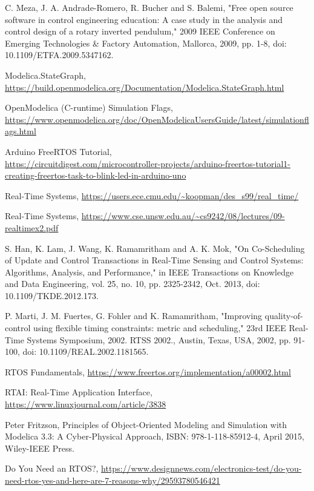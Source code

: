 \documentclass[12pt]{report}
\begin{document}
\begin{thebibliography}{111}
C. Meza, J. A. Andrade-Romero, R. Bucher and S. Balemi, "Free open source software in control engineering education: A case study in the analysis and control design of a rotary inverted pendulum," 2009 IEEE Conference on Emerging Technologies \& Factory Automation, Mallorca, 2009, pp. 1-8, doi: 10.1109/ETFA.2009.5347162.

Modelica.StateGraph, \url{https://build.openmodelica.org/Documentation/Modelica.StateGraph.html}

OpenModelica (C-runtime) Simulation Flags, \url{https://www.openmodelica.org/doc/OpenModelicaUsersGuide/latest/simulationflags.html}

Arduino FreeRTOS Tutorial,\\
\url{https://circuitdigest.com/microcontroller-projects/arduino-freertos-tutorial1-creating-freertos-task-to-blink-led-in-arduino-uno}

Real-Time Systems, \url{https://users.ece.cmu.edu/~koopman/des_s99/real_time/}

Real-Time Systems, \url{https://www.cse.unsw.edu.au/~cs9242/08/lectures/09-realtimex2.pdf}

S. Han, K. Lam, J. Wang, K. Ramamritham and A. K. Mok, "On Co-Scheduling of Update and Control Transactions in Real-Time Sensing and Control Systems: Algorithms, Analysis, and Performance," in IEEE Transactions on Knowledge and Data Engineering, vol. 25, no. 10, pp. 2325-2342, Oct. 2013, doi: 10.1109/TKDE.2012.173.

P. Marti, J. M. Fuertes, G. Fohler and K. Ramamritham, "Improving quality-of-control using flexible timing constraints: metric and scheduling," 23rd IEEE Real-Time Systems Symposium, 2002. RTSS 2002., Austin, Texas, USA, 2002, pp. 91-100, doi: 10.1109/REAL.2002.1181565.

RTOS Fundamentals, \url{https://www.freertos.org/implementation/a00002.html}





RTAI: Real-Time Application Interface, \url{https://www.linuxjournal.com/article/3838}

Peter Fritzson, Principles of Object-Oriented Modeling and Simulation with Modelica 3.3: A Cyber-Physical Approach, ISBN: 978-1-118-85912-4, April 2015, Wiley-IEEE Press. 



Do You Need an RTOS?, \url{https://www.designnews.com/electronics-test/do-you-need-rtos-yes-and-here-are-7-reasons-why/29593780546421}
\end{thebibliography}
\end{document}
